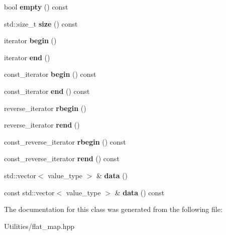 \begin{DoxyCompactItemize}
\item 
\hypertarget{classflat__map_a441b623ecb19e142a5ddad11c87c6010}{bool {\bfseries empty} () const }\label{classflat__map_a441b623ecb19e142a5ddad11c87c6010}

\item 
\hypertarget{classflat__map_a9f3e1a23bbc5c1101f301e76c503d070}{std\+::size\+\_\+t {\bfseries size} () const }\label{classflat__map_a9f3e1a23bbc5c1101f301e76c503d070}

\item 
\hypertarget{classflat__map_a7301695b0a7a9fdd07d258fcc6a4b205}{iterator {\bfseries begin} ()}\label{classflat__map_a7301695b0a7a9fdd07d258fcc6a4b205}

\item 
\hypertarget{classflat__map_a41b9475e5165f1542cdf9fc193a72ba8}{iterator {\bfseries end} ()}\label{classflat__map_a41b9475e5165f1542cdf9fc193a72ba8}

\item 
\hypertarget{classflat__map_a182181c6576aefbddc0dd58b9a3772e2}{const\+\_\+iterator {\bfseries begin} () const }\label{classflat__map_a182181c6576aefbddc0dd58b9a3772e2}

\item 
\hypertarget{classflat__map_adc262dfd937bf15806a82165241de03d}{const\+\_\+iterator {\bfseries end} () const }\label{classflat__map_adc262dfd937bf15806a82165241de03d}

\item 
\hypertarget{classflat__map_aa80ae3434ed2b0901fcbaff2091a93ab}{reverse\+\_\+iterator {\bfseries rbegin} ()}\label{classflat__map_aa80ae3434ed2b0901fcbaff2091a93ab}

\item 
\hypertarget{classflat__map_a4f45c455f9b94c174d495b4e0b20e450}{reverse\+\_\+iterator {\bfseries rend} ()}\label{classflat__map_a4f45c455f9b94c174d495b4e0b20e450}

\item 
\hypertarget{classflat__map_abd5583f53e0610b764731e5835be7fbe}{const\+\_\+reverse\+\_\+iterator {\bfseries rbegin} () const }\label{classflat__map_abd5583f53e0610b764731e5835be7fbe}

\item 
\hypertarget{classflat__map_a1b2cb77af4089b3d35dcda7e579f2d26}{const\+\_\+reverse\+\_\+iterator {\bfseries rend} () const }\label{classflat__map_a1b2cb77af4089b3d35dcda7e579f2d26}

\item 
\hypertarget{classflat__map_a0c1b4fa6cdca305eefd5a9c5091a4203}{std\+::vector$<$ value\+\_\+type $>$ \& {\bfseries data} ()}\label{classflat__map_a0c1b4fa6cdca305eefd5a9c5091a4203}

\item 
\hypertarget{classflat__map_a1473a25884b4fdc46abae379ce7110e9}{const std\+::vector$<$ value\+\_\+type $>$ \& {\bfseries data} () const }\label{classflat__map_a1473a25884b4fdc46abae379ce7110e9}

\end{DoxyCompactItemize}


The documentation for this class was generated from the following file\+:\begin{DoxyCompactItemize}
\item 
Utilities/flat\+\_\+map.\+hpp\end{DoxyCompactItemize}

